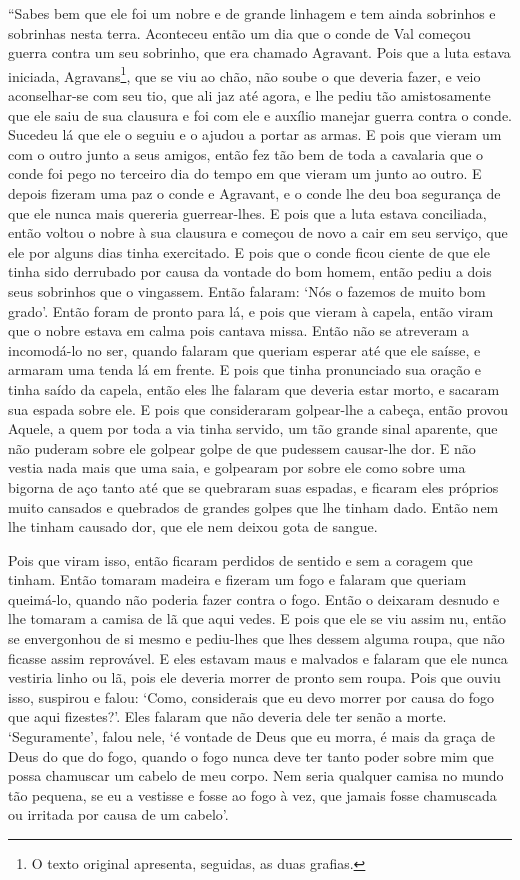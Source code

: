 “Sabes bem que ele foi um nobre e de grande linhagem e tem ainda sobrinhos e
sobrinhas nesta terra. Aconteceu então um dia que o conde de Val começou guerra
contra um seu sobrinho, que era chamado Agravant. Pois que a luta estava
iniciada, Agravans\footnote{ O texto original apresenta, seguidas, as duas
grafias.},  que se viu ao chão, não soube o que deveria fazer, e
veio aconselhar-se com seu tio, que ali jaz até agora, e lhe pediu tão
amistosamente que ele saiu de sua clausura e foi com ele e auxílio manejar
guerra contra o conde. Sucedeu lá que ele o seguiu e o ajudou a portar as
armas. E pois que vieram um com o outro junto a seus amigos, então fez tão bem
de toda a cavalaria que o conde foi pego no terceiro dia do tempo em que vieram
um junto ao outro. E depois fizeram uma paz o conde e Agravant, e o conde lhe
deu boa segurança de que ele nunca mais quereria guerrear-lhes. E pois que a
luta estava conciliada, então voltou o nobre à sua clausura e começou de novo a
cair em seu serviço, que ele por alguns dias tinha exercitado. E pois que o
conde ficou ciente de que ele tinha sido derrubado por causa da vontade do bom
homem, então pediu a dois seus sobrinhos que o vingassem. Então falaram: ‘Nós o
fazemos de muito bom grado’. Então foram de pronto para lá, e
pois que vieram à capela, então viram que o nobre estava em calma pois cantava
missa. Então não se atreveram a incomodá-lo no ser, quando falaram que queriam
esperar até que ele saísse, e armaram uma tenda lá em frente. E pois que tinha
pronunciado sua oração e tinha saído da capela, então eles lhe falaram que
deveria estar morto, e sacaram sua espada sobre ele. E pois que consideraram
golpear-lhe a cabeça, então provou Aquele, a quem por toda a via tinha servido,
um tão grande sinal aparente, que não puderam sobre ele golpear golpe de que
pudessem causar-lhe dor. E não vestia nada mais que uma saia, e
golpearam por sobre ele como sobre uma bigorna de aço tanto até que se
quebraram suas espadas, e ficaram eles próprios muito cansados e quebrados de
grandes golpes que lhe tinham dado. Então nem lhe tinham causado dor, que ele
nem deixou gota de sangue.

Pois que viram isso, então ficaram perdidos de sentido e sem a coragem que
tinham. Então tomaram madeira e fizeram um fogo e falaram que queriam
queimá-lo, quando não poderia fazer contra o fogo. Então o deixaram desnudo e
lhe tomaram a camisa de lã que aqui vedes. E pois que ele se viu assim nu,
então se envergonhou de si mesmo e pediu-lhes que lhes dessem alguma roupa, que
não ficasse assim reprovável. E eles estavam maus e malvados e falaram que ele
nunca vestiria linho ou lã, pois ele deveria morrer de pronto sem roupa. Pois
que ouviu isso, suspirou e falou: ‘Como, considerais que eu devo morrer por
causa do fogo que aqui fizestes?’. Eles falaram que não deveria dele ter senão
a morte. ‘Seguramente’, falou nele, ‘é vontade de Deus que eu morra, é mais da
graça de Deus do que do fogo, quando o fogo nunca deve ter tanto poder sobre
mim que possa chamuscar um cabelo de meu corpo. Nem seria qualquer camisa no
mundo tão pequena, se eu a vestisse e fosse ao fogo à vez, que jamais fosse
chamuscada ou irritada por causa de um cabelo’. 

